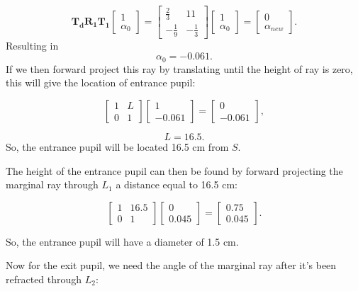 \documentclass[a4paper]{article}
\begin{document}
$$
\bm{T_d}\bm{R_1}\bm{T_1}
\begin{bmatrix}
    1   \\
    \alpha_{0}
\end{bmatrix}
= 
\begin{bmatrix}
    \frac{2}{3} & 11\\
    - \frac{1}{9} & - \frac{1}{3}
\end{bmatrix}
\begin{bmatrix}
    1   \\
    \alpha_{0}
\end{bmatrix}
=
\begin{bmatrix}
    0   \\
    \alpha_{new}
\end{bmatrix}.
$$
Resulting in 
$$ \alpha_{0} = -0.061.$$
If we then forward project this ray by translating until the height of ray is zero, this will give the location of entrance pupil:

$$
\begin{bmatrix}
    1 & L\\
    0 & 1
\end{bmatrix}
\begin{bmatrix}
    1   \\
    -0.061
\end{bmatrix}
=
\begin{bmatrix}
    0   \\
    -0.061
\end{bmatrix},
$$

$$ L = 16.5.$$
So, the entrance pupil will be located 16.5 cm from $S$.

The height of the entrance pupil can then be found by forward projecting the marginal ray through $L_1$ a distance equal to 16.5 cm:

$$ 
\begin{bmatrix}
    1 & 16.5\\
    0 & 1
\end{bmatrix}
\begin{bmatrix}
    0   \\
    0.045
\end{bmatrix}
=
\begin{bmatrix}
    0.75   \\
    0.045
\end{bmatrix}.
$$

So, the entrance pupil will have a diameter of 1.5 cm.

Now for the exit pupil, we need the angle of the marginal ray after it's been refracted through $L_2$:
\end{document}
